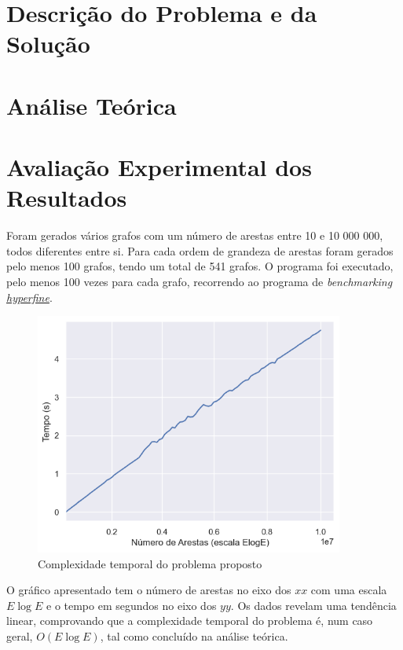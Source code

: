 \documentclass[12pt,a4paper]{article}
\begin{document}
  \section{Descrição do Problema e da Solução}

  \section{Análise Teórica}

  \section{Avaliação Experimental dos Resultados}

  Foram gerados vários grafos com um número de arestas entre 10 e 10 000 000, todos diferentes entre si. Para cada ordem de grandeza de arestas foram gerados pelo menos 100 grafos, tendo um total de 541 grafos.
  O programa foi executado, pelo menos 100 vezes para cada grafo, recorrendo ao programa de \textit{benchmarking} \href{https://github.com/sharkdp/hyperfine}{\textit{hyperfine}}.

  \begin{figure}[H]
    \centering
    \includegraphics[width=4in]{report.png}
    \caption{Complexidade temporal do problema proposto}
    \label{fig:graphic}
  \end{figure}

  O gráfico apresentado tem o número de arestas no eixo dos $xx$ com uma escala $E \log E$ e o tempo em segundos no eixo dos $yy$.
  Os dados revelam uma tendência linear, comprovando que a complexidade temporal do problema é, num caso geral, $O(E\log E)$, tal como concluído na análise teórica.

  \printbibliography[title={Referências}]
\end{document}
